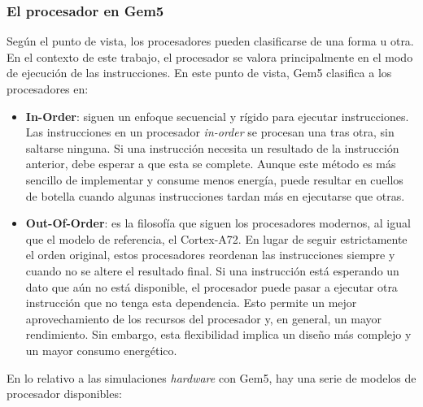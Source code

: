 \subsubsection{El procesador en Gem5}
\label{subs:Gem5-procesador}

Según el punto de vista, los procesadores pueden clasificarse de una forma u otra. En el contexto de este trabajo, el procesador se valora principalmente en el modo de ejecución de las instrucciones. En este punto de vista, Gem5 clasifica a los procesadores en:

\begin{itemize}
    \item \textbf{In-Order}: siguen un enfoque secuencial y rígido para ejecutar instrucciones. Las instrucciones en un procesador \textit{in-order} se procesan una tras otra, sin saltarse ninguna. Si una instrucción necesita un resultado de la instrucción anterior, debe esperar a que esta se complete. Aunque este método es más sencillo de implementar y consume menos energía, puede resultar en cuellos de botella cuando algunas instrucciones tardan más en ejecutarse que otras.
    
    \item \textbf{Out-Of-Order}: es la filosofía que siguen los procesadores modernos, al igual que el modelo de referencia, el Cortex-A72. En lugar de seguir estrictamente el orden original, estos procesadores reordenan las instrucciones siempre y cuando no se altere el resultado final. Si una instrucción está esperando un dato que aún no está disponible, el procesador puede pasar a ejecutar otra instrucción que no tenga esta dependencia. Esto permite un mejor aprovechamiento de los recursos del procesador y, en general, un mayor rendimiento. Sin embargo, esta flexibilidad implica un diseño más complejo y un mayor consumo energético. 
\end{itemize}

En lo relativo a las simulaciones \textit{hardware} con Gem5, hay una serie de modelos de procesador disponibles:

